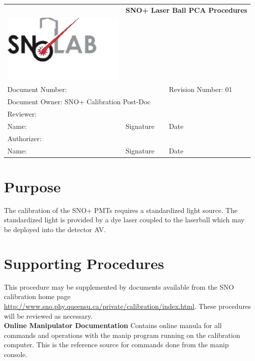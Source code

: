 \documentclass[11pt]{article}
\begin{document}
\begin{tabular}{||l|l|l||}
\hline\hline
& \multicolumn{2}{p{8cm}||}{\bf SNO+ Laser Ball PCA Procedures} \\
\includegraphics[width=6cm]{../snolablogo.pdf} & \multicolumn{2}{p{8cm}||}{} \\
\hline
\multicolumn{2}{||p{8.5cm}|}{Document Number:} & Revision Number: 01\\
\hline
\multicolumn{3}{||l||}{Document Owner: SNO+ Calibration Post-Doc} \\
\hline
\multicolumn{3}{||l||}{Reviewer:}\\
\hline
Name: & Signature & Date \\
\hline
\multicolumn{3}{||l||}{Authorizer:}\\
\hline
Name: & Signature & Date \\
\hline\hline
\end{tabular}
\thispagestyle{empty}

\section{Purpose}

The calibration of the SNO+ PMTs requires a standardized light source. The standardized light is provided by a dye laser coupled to the laserball which may be deployed into the detector AV. 

\section{Supporting Procedures}

This procedure may be supplemented by documents available from the SNO calibration home page
\url{http://www.sno.phy.queensu.ca/private/calibration/index.html}.
These procedures will be reviewed as necessary.\\

{\bf Online Manipulator Documentation} Contains online manula for all commands and operations with the manip program running on the calibration computer. This is the reference source for commands done from the manip console.\\
\end{document}
